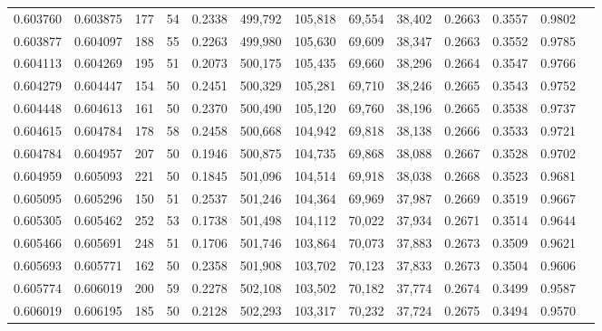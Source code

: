 \begin{tabular}{rrrrrrrrrrrrr}
0.603760 & 0.603875 &   177 &  54 &                                     0.2338 & 499,792 & 105,818 &  69,554 &  38,402 & 0.2663 & 0.3557 & 0.9802 \\
0.603877 & 0.604097 &   188 &  55 &                                     0.2263 & 499,980 & 105,630 &  69,609 &  38,347 & 0.2663 & 0.3552 & 0.9785 \\
0.604113 & 0.604269 &   195 &  51 &                                     0.2073 & 500,175 & 105,435 &  69,660 &  38,296 & 0.2664 & 0.3547 & 0.9766 \\
0.604279 & 0.604447 &   154 &  50 &                                     0.2451 & 500,329 & 105,281 &  69,710 &  38,246 & 0.2665 & 0.3543 & 0.9752 \\
0.604448 & 0.604613 &   161 &  50 &                                     0.2370 & 500,490 & 105,120 &  69,760 &  38,196 & 0.2665 & 0.3538 & 0.9737 \\
0.604615 & 0.604784 &   178 &  58 &                                     0.2458 & 500,668 & 104,942 &  69,818 &  38,138 & 0.2666 & 0.3533 & 0.9721 \\
0.604784 & 0.604957 &   207 &  50 &                                     0.1946 & 500,875 & 104,735 &  69,868 &  38,088 & 0.2667 & 0.3528 & 0.9702 \\
0.604959 & 0.605093 &   221 &  50 &                                     0.1845 & 501,096 & 104,514 &  69,918 &  38,038 & 0.2668 & 0.3523 & 0.9681 \\
0.605095 & 0.605296 &   150 &  51 &                                     0.2537 & 501,246 & 104,364 &  69,969 &  37,987 & 0.2669 & 0.3519 & 0.9667 \\
0.605305 & 0.605462 &   252 &  53 &                                     0.1738 & 501,498 & 104,112 &  70,022 &  37,934 & 0.2671 & 0.3514 & 0.9644 \\
0.605466 & 0.605691 &   248 &  51 &                                     0.1706 & 501,746 & 103,864 &  70,073 &  37,883 & 0.2673 & 0.3509 & 0.9621 \\
0.605693 & 0.605771 &   162 &  50 &                                     0.2358 & 501,908 & 103,702 &  70,123 &  37,833 & 0.2673 & 0.3504 & 0.9606 \\
0.605774 & 0.606019 &   200 &  59 &                                     0.2278 & 502,108 & 103,502 &  70,182 &  37,774 & 0.2674 & 0.3499 & 0.9587 \\
0.606019 & 0.606195 &   185 &  50 &                                     0.2128 & 502,293 & 103,317 &  70,232 &  37,724 & 0.2675 & 0.3494 & 0.9570 \\

\end{tabular}
